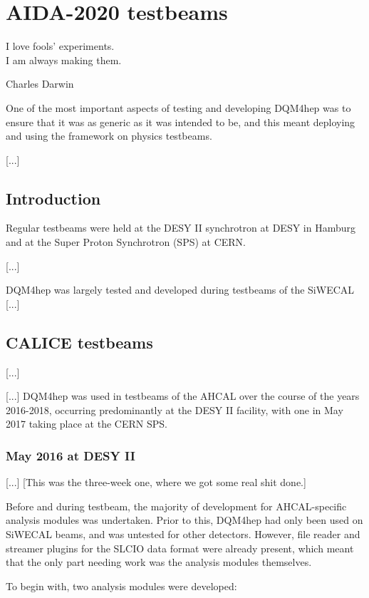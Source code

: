 \chapter{AIDA-2020 testbeams}

\epigraph{I love fools' experiments. \\I am always making them.}{Charles Darwin}

One of the most important aspects of testing and developing DQM4hep was to ensure that it was as generic as it was intended to be, and this meant deploying and using the framework on physics testbeams.


[...]

\section{Introduction}

Regular testbeams were held at the DESY II synchrotron at DESY in Hamburg and at the Super Proton Synchrotron (SPS) at CERN. 

[...]

DQM4hep was largely tested and developed during testbeams of the SiWECAL [...]

\section{CALICE testbeams}
[...]

[...] DQM4hep was used in testbeams of the AHCAL over the course of the years 2016-2018, occurring predominantly at the DESY II facility, with one in May 2017 taking place at the CERN SPS.

\subsection{May 2016 at DESY II}
[...] [This was the three-week one, where we got some real shit done.]

Before and during testbeam, the majority of development for AHCAL-specific analysis modules was undertaken. Prior to this, DQM4hep had only been used on SiWECAL beams, and was untested for other detectors. However, file reader and streamer plugins for the SLCIO data format were already present, which meant that the only part needing work was the analysis modules themselves.

To begin with, two analysis modules were developed: 

